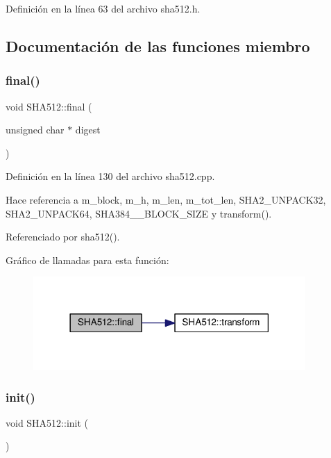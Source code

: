 Definición en la línea 63 del archivo sha512.\+h.



\subsection{Documentación de las funciones miembro}
\hypertarget{classSHA512_a6db56be0379bbf38babee9567356ad68}{}\label{classSHA512_a6db56be0379bbf38babee9567356ad68} 
\subsubsection{\texorpdfstring{final()}{final()}}
{\footnotesize\ttfamily void S\+H\+A512\+::final (\begin{DoxyParamCaption}\item[{unsigned char $\ast$}]{digest }\end{DoxyParamCaption})}



Definición en la línea 130 del archivo sha512.\+cpp.



Hace referencia a m\+\_\+block, m\+\_\+h, m\+\_\+len, m\+\_\+tot\+\_\+len, S\+H\+A2\+\_\+\+U\+N\+P\+A\+C\+K32, S\+H\+A2\+\_\+\+U\+N\+P\+A\+C\+K64, S\+H\+A384\+\_\+\_\+\+B\+L\+O\+C\+K\+\_\+\+S\+I\+ZE y transform().



Referenciado por sha512().

Gráfico de llamadas para esta función\+:\nopagebreak
\begin{figure}[H]
\begin{center}
\leavevmode
\includegraphics[width=294pt]{classSHA512_a6db56be0379bbf38babee9567356ad68_cgraph}
\end{center}
\end{figure}
\hypertarget{classSHA512_a92d7e88a28d0bd70930df68bfcd4d136}{}\label{classSHA512_a92d7e88a28d0bd70930df68bfcd4d136} 
\subsubsection{\texorpdfstring{init()}{init()}}
{\footnotesize\ttfamily void S\+H\+A512\+::init (\begin{DoxyParamCaption}{ }\end{DoxyParamCaption})}



